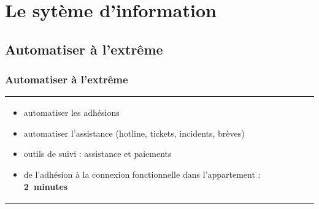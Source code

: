 \documentclass[handout]{beamer}
\begin{document}
	\section{Le sytème d'information}

	\subsection{Automatiser à l'extrême}
		\begin{frame}
		\frametitle{Automatiser à l'extrême}
		\begin{tabular}{l l}
			\begin{minipage}{0.2\textwidth}
				\begin{center}
				\end{center}
			\end{minipage}

			\begin{minipage}{0.8\textwidth}
				\begin{itemize}
					\item automatiser les adhésions
					\item automatiser l'assistance (hotline, tickets, incidents, brèves)
					\item outils de suivi : assistance et paiements
					\item de l'adhésion à la connexion fonctionnelle dans l'appartement : \mbox{\textbf{2 minutes}}
				\end{itemize}
			\end{minipage}
			
		\end{tabular}
		\end{frame}
\end{document}

